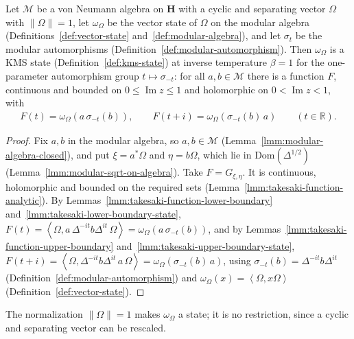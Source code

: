 \begin{theorem}
    \label{thrm:takesaki-kms}
    \leanok
    Let $\mathcal{M}$ be a von Neumann algebra on $\mathbf{H}$ with a cyclic and separating vector $\Omega$ with $\|\Omega\| = 1$, let $\omega_\Omega$ be the vector state of $\Omega$ on the modular algebra (Definitions~\ref{def:vector-state} and~\ref{def:modular-algebra}), and let $\sigma_t$ be the modular automorphisms (Definition~\ref{def:modular-automorphism}). Then $\omega_\Omega$ is a KMS state (Definition~\ref{def:kms-state}) at inverse temperature $\beta = 1$ for the one-parameter automorphism group $t \mapsto \sigma_{-t}$: for all $a, b \in \mathcal{M}$ there is a function $F$, continuous and bounded on $0 \le \operatorname{Im} z \le 1$ and holomorphic on $0 < \operatorname{Im} z < 1$, with
    \begin{align}
        F(t) = \omega_\Omega(a\,\sigma_{-t}(b)), \qquad F(t + i) = \omega_\Omega(\sigma_{-t}(b)\,a) \qquad (t \in \mathbb{R}).
    \end{align}
\end{theorem}
\begin{proof}
    \leanok
    Fix $a, b$ in the modular algebra, so $a, b \in \mathcal{M}$ (Lemma~\ref{lmm:modular-algebra-closed}), and put $\xi = a^*\Omega$ and $\eta = b\Omega$, which lie in $\text{Dom}(\Delta^{1/2})$ (Lemma~\ref{lmm:modular-sqrt-on-algebra}). Take $F = G_{\xi,\eta}$. It is continuous, holomorphic and bounded on the required sets (Lemma~\ref{lmm:takesaki-function-analytic}). By Lemmas~\ref{lmm:takesaki-function-lower-boundary} and~\ref{lmm:takesaki-lower-boundary-state}, $F(t) = \left< \Omega, a\,\Delta^{-it}b\Delta^{it}\,\Omega \right> = \omega_\Omega(a\,\sigma_{-t}(b))$, and by Lemmas~\ref{lmm:takesaki-function-upper-boundary} and~\ref{lmm:takesaki-upper-boundary-state}, $F(t + i) = \left< \Omega, \Delta^{-it}b\Delta^{it}\,a\,\Omega \right> = \omega_\Omega(\sigma_{-t}(b)\,a)$, using $\sigma_{-t}(b) = \Delta^{-it}b\Delta^{it}$ (Definition~\ref{def:modular-automorphism}) and $\omega_\Omega(x) = \left< \Omega, x\Omega \right>$ (Definition~\ref{def:vector-state}).
\end{proof}

The normalization $\|\Omega\| = 1$ makes $\omega_\Omega$ a state; it is no restriction, since a cyclic and separating vector can be rescaled.
